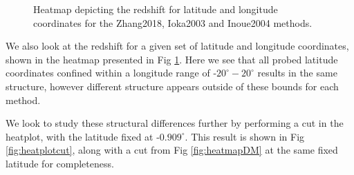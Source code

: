 \documentclass{article}
\begin{document}
\begin{figure}[!htb]
\centering
{}\hfill
{}\par 
{}
\caption{Heatmap depicting the redshift for latitude and longitude coordinates for the Zhang2018, Ioka2003 and Inoue2004 methods.}
\label{fig:heatplotZ}
\end{figure}

We also look at the redshift for a given set of latitude and longitude coordinates, shown in the heatmap presented in Fig \ref{fig:heatplotZ}. Here we see that all probed latitude coordinates confined within a longitude range of -$20^\circ-20^\circ$ results in the same structure, however different structure appears outside of these bounds for each method. 

We look to study these structural differences further by performing a cut in the heatplot, with the latitude fixed at -$0.909^\circ$. This result is shown in Fig \ref{fig:heatplotcut}, along with a cut from Fig \ref{fig:heatmapDM} at the same fixed latitude for completeness.
\end{document}
